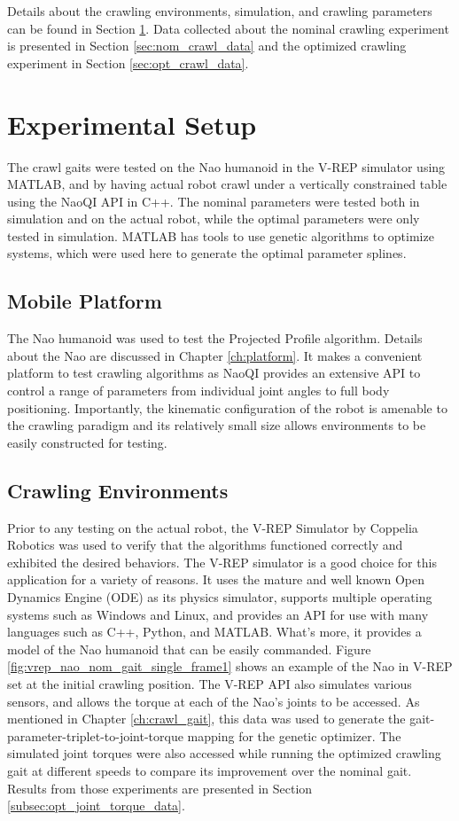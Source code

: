 Details about the crawling environments, simulation, and crawling parameters can be found in
Section \ref{sec:crawl_exp_setup}. Data collected about the nominal crawling experiment is
presented in Section \ref{sec:nom_crawl_data} and the optimized crawling experiment in 
Section \ref{sec:opt_crawl_data}.

\FloatBarrier
\section{Experimental Setup} \label{sec:crawl_exp_setup}
The crawl gaits were tested on the Nao humanoid in the V-REP simulator using MATLAB,
and by having actual robot crawl under a vertically constrained table using the NaoQI API in C++.
The nominal parameters were tested both in simulation and on the actual robot, while
the optimal parameters were only tested in simulation. MATLAB has tools to use genetic
algorithms to optimize systems, which were used here to generate the optimal parameter
splines.

\subsection{Mobile Platform}
The Nao humanoid was used to test the Projected Profile algorithm.
Details about the Nao are discussed in Chapter \ref{ch:platform}. It makes
a convenient platform to test crawling algorithms as NaoQI provides an extensive
API to control a range of parameters from individual joint angles to 
full body positioning. Importantly, the kinematic configuration of the robot is amenable 
to the crawling paradigm and its relatively small size allows environments to be
easily constructed for testing.

\subsection{Crawling Environments} \label{subsec:crawl_environments}
Prior to any testing on the actual robot, the V-REP Simulator by Coppelia Robotics was used
to verify that the algorithms functioned correctly and exhibited the desired behaviors.
The V-REP simulator is a good choice for this application for a variety of reasons.
It uses the mature and well known Open Dynamics Engine (ODE) as its physics simulator, supports multiple
operating systems such as Windows and Linux, and provides an API for use with many
languages such as C++, Python, and MATLAB. What's more, it provides a model of the Nao
humanoid that can be easily commanded.
Figure \ref{fig:vrep_nao_nom_gait_single_frame1} shows an example of the Nao in V-REP
set at the initial crawling position.
The V-REP API also simulates various sensors, and allows the torque at each of the Nao's
joints to be accessed. As mentioned in Chapter \ref{ch:crawl_gait}, this data was used
to generate the gait-parameter-triplet-to-joint-torque mapping for the genetic optimizer.
The simulated joint torques were also accessed while running the optimized crawling
gait at different speeds to compare its improvement over the nominal gait.
Results from those experiments are presented in Section \ref{subsec:opt_joint_torque_data}.

